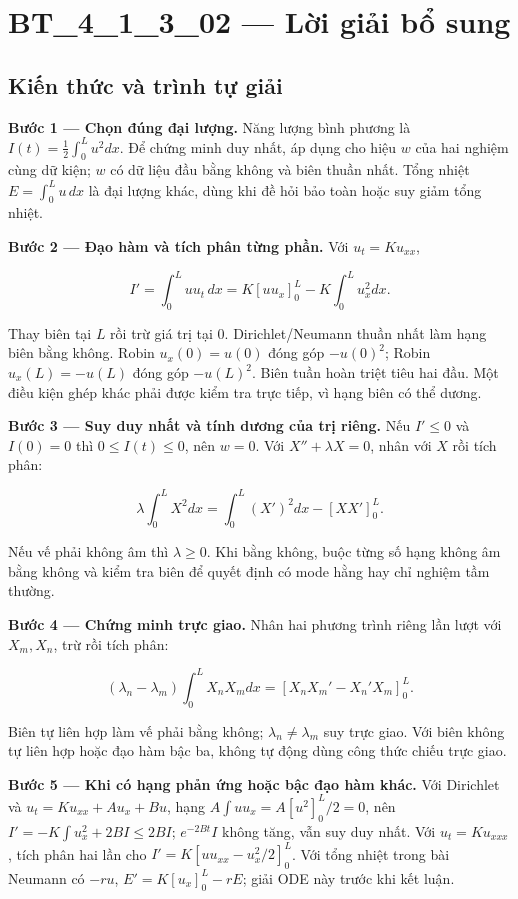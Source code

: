 \documentclass[10pt,a4paper]{article}
\begin{document}
\section*{BT\_4\_1\_3\_02 — Lời giải bổ sung}
\subsection*{Kiến thức và trình tự giải}
\textbf{Bước 1 — Chọn đúng đại lượng.} Năng lượng bình phương là $I(t)=\frac12\int_0^Lu^2dx$. Để chứng minh duy nhất, áp dụng cho hiệu $w$ của hai nghiệm cùng dữ kiện; $w$ có dữ liệu đầu bằng không và biên thuần nhất. Tổng nhiệt $E=\int_0^Lu\,dx$ là đại lượng khác, dùng khi đề hỏi bảo toàn hoặc suy giảm tổng nhiệt.

\textbf{Bước 2 — Đạo hàm và tích phân từng phần.} Với $u_t=Ku_{xx}$,


\[
I'=\int_0^Luu_t\,dx
=K[uu_x]_0^L-K\int_0^Lu_x^2dx.
\]


Thay biên tại $L$ rồi trừ giá trị tại $0$. Dirichlet/Neumann thuần nhất làm hạng biên bằng không. Robin $u_x(0)=u(0)$ đóng góp $-u(0)^2$; Robin $u_x(L)=-u(L)$ đóng góp $-u(L)^2$. Biên tuần hoàn triệt tiêu hai đầu. Một điều kiện ghép khác phải được kiểm tra trực tiếp, vì hạng biên có thể dương.

\textbf{Bước 3 — Suy duy nhất và tính dương của trị riêng.} Nếu $I'\le0$ và $I(0)=0$ thì $0\le I(t)\le0$, nên $w=0$. Với $X''+\lambda X=0$, nhân với $X$ rồi tích phân:


\[
\lambda\int_0^LX^2dx=\int_0^L(X')^2dx-[XX']_0^L.
\]


Nếu vế phải không âm thì $\lambda\ge0$. Khi bằng không, buộc từng số hạng không âm bằng không và kiểm tra biên để quyết định có mode hằng hay chỉ nghiệm tầm thường.

\textbf{Bước 4 — Chứng minh trực giao.} Nhân hai phương trình riêng lần lượt với $X_m,X_n$, trừ rồi tích phân:


\[
(\lambda_n-\lambda_m)\int_0^LX_nX_mdx
=[X_nX_m'-X_n'X_m]_0^L.
\]


Biên tự liên hợp làm vế phải bằng không; $\lambda_n\ne\lambda_m$ suy trực giao. Với biên không tự liên hợp hoặc đạo hàm bậc ba, không tự động dùng công thức chiếu trực giao.

\textbf{Bước 5 — Khi có hạng phản ứng hoặc bậc đạo hàm khác.} Với Dirichlet và $u_t=Ku_{xx}+Au_x+Bu$, hạng $A\int uu_x=A[u^2]_0^L/2=0$, nên $I'=-K\int u_x^2+2BI\le2BI$; $e^{-2Bt}I$ không tăng, vẫn suy duy nhất. Với $u_t=Ku_{xxx}$, tích phân hai lần cho $I'=K[uu_{xx}-u_x^2/2]_0^L$. Với tổng nhiệt trong bài Neumann có $-ru$, $E'=K[u_x]_0^L-rE$; giải ODE này trước khi kết luận.
\end{document}

